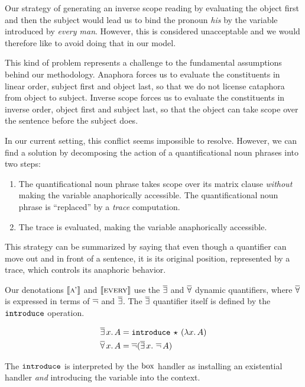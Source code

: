 Our strategy of generating an inverse scope reading by evaluating the
object first and then the subject would lead us to bind the pronoun
\emph{his} by the variable introduced by \emph{every man}. However, this is
considered unacceptable and we would therefore like to avoid doing that in
our model.

This kind of problem represents a challenge to the fundamental assumptions
behind our methodology. Anaphora forces us to evaluate the constituents in
linear order, subject first and object last, so that we do not license
cataphora from object to subject. Inverse scope forces us to evaluate the
constituents in inverse order, object first and subject last, so that the
object can take scope over the sentence before the subject does.

In our current setting, this conflict seems impossible to resolve. However,
we can find a solution by decomposing the action of a quantificational noun
phrases into two steps:

\begin{enumerate}
\item The quantificational noun phrase takes scope over its matrix clause
  \emph{without} making the variable anaphorically accessible. The
  quantificational noun phrase is ``replaced'' by a \emph{trace}
  computation.
\item The trace is evaluated, making the variable anaphorically accessible.
\end{enumerate}

This strategy can be summarized by saying that even though a quantifier can
move out and in front of a sentence, it is its original position,
represented by a trace, which controls its anaphoric behavior.

Our denotations $\llbracket \textsc{a'} \rrbracket$ and $\llbracket \textsc{every} \rrbracket$ use the $\mathop{\overline{\exists}}$
and $\mathop{\overline{\forall}}$ dynamic quantifiers, where $\mathop{\overline{\forall}}$ is expressed in terms
of $\mathop{\overline{\lnot}}$ and $\mathop{\overline{\exists}}$. The $\mathop{\overline{\exists}}$ quantifier itself is defined by
the $\mathtt{introduce}$ operation.

\begin{align*}
  \mathop{\overline{\exists}} x.\,A &= \mathtt{introduce}\,\star\,(\lambda x.\, A) \\
  \mathop{\overline{\forall}} x.\,A &= \mathop{\overline{\lnot}} (\mathop{\overline{\exists}} x.\,\mathop{\overline{\lnot}} A)
\end{align*}

The $\mathtt{introduce}$ is interpreted by the $\mathrm{box}$ handler as installing an
existential handler \emph{and} introducing the variable into the context.

